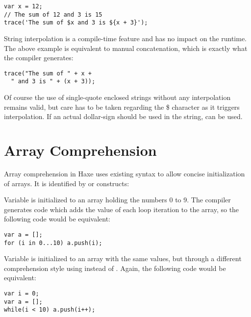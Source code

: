 \begin{lstlisting}
var x = 12;
// The sum of 12 and 3 is 15
trace('The sum of $x and 3 is ${x + 3}');
\end{lstlisting}
String interpolation is a compile-time feature and has no impact on the runtime. The above example is equivalent to manual concatenation, which is exactly what the compiler generates:

\begin{lstlisting}
trace("The sum of " + x +
  " and 3 is " + (x + 3));
\end{lstlisting}
Of course the use of single-quote enclosed strings without any interpolation remains valid, but care has to be taken regarding the \$ character as it triggers interpolation. If an actual dollar-sign should be used in the string, \expr{\$\$} can be used.



\section{Array Comprehension}
\label{lf-array-comprehension}


Array comprehension in Haxe uses existing syntax to allow concise initialization of arrays. It is identified by  or  constructs:


Variable  is initialized to an array holding the numbers 0 to 9. The compiler generates code which adds the value of each loop iteration to the array, so the following code would be equivalent:

\begin{lstlisting}
var a = [];
for (i in 0...10) a.push(i);
\end{lstlisting}

Variable  is initialized to an array with the same values, but through a different comprehension style using  instead of . Again, the following code would be equivalent:

\begin{lstlisting}
var i = 0;
var a = [];
while(i < 10) a.push(i++);
\end{lstlisting}

